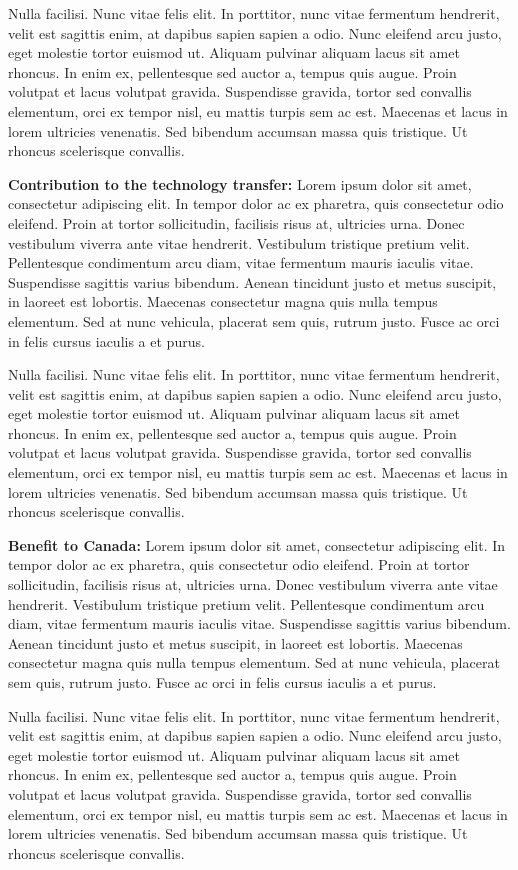\documentclass[12pt]{article}
\begin{document}
Nulla facilisi. Nunc vitae felis elit. In porttitor, nunc vitae fermentum hendrerit, velit est sagittis enim, at dapibus sapien sapien a odio. Nunc eleifend arcu justo, eget molestie tortor euismod ut. Aliquam pulvinar aliquam lacus sit amet rhoncus. In enim ex, pellentesque sed auctor a, tempus quis augue. Proin volutpat et lacus volutpat gravida. Suspendisse gravida, tortor sed convallis elementum, orci ex tempor nisl, eu mattis turpis sem ac est. Maecenas et lacus in lorem ultricies venenatis. Sed bibendum accumsan massa quis tristique. Ut rhoncus scelerisque convallis. 

\vskip 2mm
\noindent
{\bf Contribution to the technology transfer:}
 Lorem ipsum dolor sit amet, consectetur adipiscing elit. In tempor dolor ac ex pharetra, quis consectetur odio eleifend. Proin at tortor sollicitudin, facilisis risus at, ultricies urna. Donec vestibulum viverra ante vitae hendrerit. Vestibulum tristique pretium velit. Pellentesque condimentum arcu diam, vitae fermentum mauris iaculis vitae. Suspendisse sagittis varius bibendum. Aenean tincidunt justo et metus suscipit, in laoreet est lobortis. Maecenas consectetur magna quis nulla tempus elementum. Sed at nunc vehicula, placerat sem quis, rutrum justo. Fusce ac orci in felis cursus iaculis a et purus.

Nulla facilisi. Nunc vitae felis elit. In porttitor, nunc vitae fermentum hendrerit, velit est sagittis enim, at dapibus sapien sapien a odio. Nunc eleifend arcu justo, eget molestie tortor euismod ut. Aliquam pulvinar aliquam lacus sit amet rhoncus. In enim ex, pellentesque sed auctor a, tempus quis augue. Proin volutpat et lacus volutpat gravida. Suspendisse gravida, tortor sed convallis elementum, orci ex tempor nisl, eu mattis turpis sem ac est. Maecenas et lacus in lorem ultricies venenatis. Sed bibendum accumsan massa quis tristique. Ut rhoncus scelerisque convallis. 

\vskip 2mm
\noindent
{\bf Benefit to Canada:} 
 Lorem ipsum dolor sit amet, consectetur adipiscing elit. In tempor dolor ac ex pharetra, quis consectetur odio eleifend. Proin at tortor sollicitudin, facilisis risus at, ultricies urna. Donec vestibulum viverra ante vitae hendrerit. Vestibulum tristique pretium velit. Pellentesque condimentum arcu diam, vitae fermentum mauris iaculis vitae. Suspendisse sagittis varius bibendum. Aenean tincidunt justo et metus suscipit, in laoreet est lobortis. Maecenas consectetur magna quis nulla tempus elementum. Sed at nunc vehicula, placerat sem quis, rutrum justo. Fusce ac orci in felis cursus iaculis a et purus.

Nulla facilisi. Nunc vitae felis elit. In porttitor, nunc vitae fermentum hendrerit, velit est sagittis enim, at dapibus sapien sapien a odio. Nunc eleifend arcu justo, eget molestie tortor euismod ut. Aliquam pulvinar aliquam lacus sit amet rhoncus. In enim ex, pellentesque sed auctor a, tempus quis augue. Proin volutpat et lacus volutpat gravida. Suspendisse gravida, tortor sed convallis elementum, orci ex tempor nisl, eu mattis turpis sem ac est. Maecenas et lacus in lorem ultricies venenatis. Sed bibendum accumsan massa quis tristique. Ut rhoncus scelerisque convallis. 

 
\end{document}
